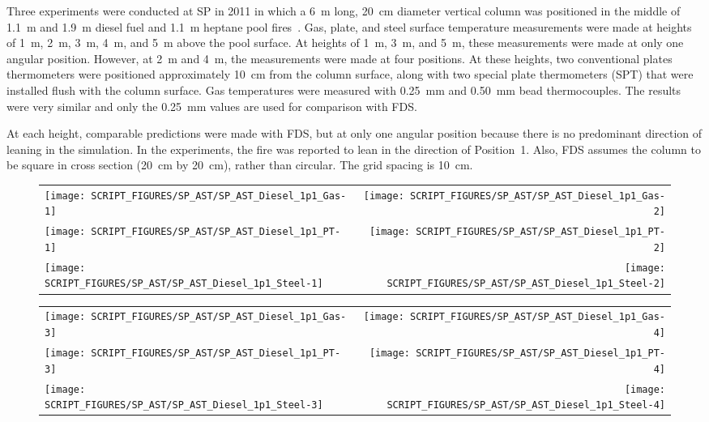 Three experiments were conducted at SP in 2011 in which a 6~m long, 20~cm diameter vertical column was positioned in the middle of 1.1~m and 1.9~m diesel fuel and 1.1~m heptane
pool fires~\cite{Sjostrom:AST}. Gas, plate, and steel surface temperature measurements were made at heights of 1~m, 2~m, 3~m, 4~m, and 5~m above the pool surface. At heights of 1~m, 3~m, and 5~m, these measurements were made at only one angular position. However, at 2~m and 4~m, the measurements were made at four positions. At these heights, two conventional plates thermometers were positioned approximately 10~cm from the column surface, along with two special plate thermometers (SPT) that were installed flush with the column surface. Gas temperatures were measured with 0.25~mm and 0.50~mm bead thermocouples. The results were very similar and only the 0.25~mm values are used for comparison with FDS.

At each height, comparable predictions were made with FDS, but at only one angular position because there is no predominant direction of leaning in the simulation. In the experiments, the fire was reported to lean in the direction of Position~1. Also, FDS assumes the column to be square in cross section (20~cm by 20~cm), rather than circular. The grid spacing is 10~cm.

\begin{figure}[h!]
\begin{tabular*}{\textwidth}{l@{\extracolsep{\fill}}r}
\texttt{[image: SCRIPT\_FIGURES/SP\_AST/SP\_AST\_Diesel\_1p1\_Gas-1]}   &  \texttt{[image: SCRIPT\_FIGURES/SP\_AST/SP\_AST\_Diesel\_1p1\_Gas-2]}    \\
\texttt{[image: SCRIPT\_FIGURES/SP\_AST/SP\_AST\_Diesel\_1p1\_PT-1]}    &  \texttt{[image: SCRIPT\_FIGURES/SP\_AST/SP\_AST\_Diesel\_1p1\_PT-2]}     \\
\texttt{[image: SCRIPT\_FIGURES/SP\_AST/SP\_AST\_Diesel\_1p1\_Steel-1]} &  \texttt{[image: SCRIPT\_FIGURES/SP\_AST/SP\_AST\_Diesel\_1p1\_Steel-2]}
\end{tabular*}
\label{SP_Diesel_1p1_1m}
\end{figure}

\newpage

\begin{figure}[p]
\begin{tabular*}{\textwidth}{l@{\extracolsep{\fill}}r}
\texttt{[image: SCRIPT\_FIGURES/SP\_AST/SP\_AST\_Diesel\_1p1\_Gas-3]}   &  \texttt{[image: SCRIPT\_FIGURES/SP\_AST/SP\_AST\_Diesel\_1p1\_Gas-4]}   \\
\texttt{[image: SCRIPT\_FIGURES/SP\_AST/SP\_AST\_Diesel\_1p1\_PT-3]}    &  \texttt{[image: SCRIPT\_FIGURES/SP\_AST/SP\_AST\_Diesel\_1p1\_PT-4]}    \\
\texttt{[image: SCRIPT\_FIGURES/SP\_AST/SP\_AST\_Diesel\_1p1\_Steel-3]} &  \texttt{[image: SCRIPT\_FIGURES/SP\_AST/SP\_AST\_Diesel\_1p1\_Steel-4]}
\end{tabular*}
\label{SP_Diesel_1p1_3m}
\end{figure}

